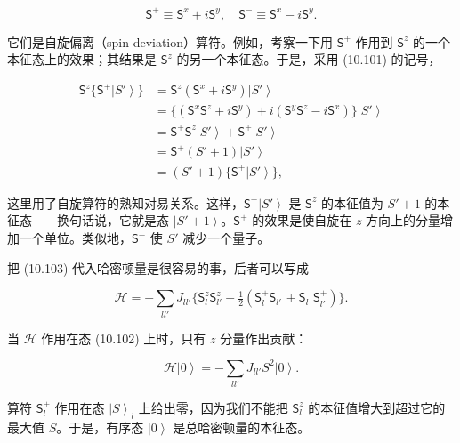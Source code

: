 \begin{equation*}
\mathsf{S}^{+} \equiv \mathsf{S}^{x} + i\mathsf{S}^{y}, \quad \mathsf{S}^{-} \equiv \mathsf{S}^{x} - i\mathsf{S}^{y}.
\tag{10.103}
\end{equation*}

它们是自旋偏离（spin-deviation）算符。例如，考察一下用 $\mathsf{S}^{+}$ 作用到 $\mathsf{S}^z$ 的一个本征态上的效果；其结果是 $\mathsf{S}^z$ 的另一个本征态。于是，采用 (10.101) 的记号，

\begin{align*}
\mathsf{S}^z\{\mathsf{S}^{+}\left|S'\right\rangle\} &= \mathsf{S}^z(\mathsf{S}^{x}+i\mathsf{S}^{y})\left|S'\right\rangle\\
&= \{(\mathsf{S}^{x}\mathsf{S}^z+i\mathsf{S}^{y})+i(\mathsf{S}^{y}\mathsf{S}^z-i\mathsf{S}^{x})\}\left|S'\right\rangle\\
&= \mathsf{S}^{+}\mathsf{S}^z\left|S'\right\rangle+\mathsf{S}^{+}\left|S'\right\rangle\\
&= \mathsf{S}^{+}(S'+1)\left|S'\right\rangle\\
&= (S'+1)\{\mathsf{S}^{+}\left|S'\right\rangle\},
\tag{10.104}
\end{align*}

这里用了自旋算符的熟知对易关系。这样，$\mathsf{S}^{+}\left|S'\right\rangle$ 是 $\mathsf{S}^z$ 的本征值为 $S'+1$ 的本征态——换句话说，它就是态 $\left|S'+1\right\rangle$。$\mathsf{S}^{+}$ 的效果是使自旋在 $z$ 方向上的分量增加一个单位。类似地，$\mathsf{S}^{-}$ 使 $S'$ 减少一个量子。


把 (10.103) 代入哈密顿量是很容易的事，后者可以写成

\begin{equation*}
\mathcal{H} = -\sum_{ll'} J_{ll'}\{\mathsf{S}_l^z\mathsf{S}_{l'}^z + \tfrac{1}{2}(\mathsf{S}_l^{+}\mathsf{S}_{l'}^{-}+\mathsf{S}_l^{-}\mathsf{S}_{l'}^{+})\}.
\tag{10.105}
\end{equation*}

当 $\mathcal{H}$ 作用在态 (10.102) 上时，只有 $z$ 分量作出贡献：

\begin{equation*}
\mathcal{H}\left|0\right\rangle = -\sum_{ll'} J_{ll'}S^2\left|0\right\rangle.
\tag{10.106}
\end{equation*}

算符 $\mathsf{S}_l^{+}$ 作用在态 $\left|S\right\rangle_l$ 上给出零，因为我们不能把 $\mathsf{S}_l^z$ 的本征值增大到超过它的最大值 $S$。于是，有序态 $\left|0\right\rangle$ 是总哈密顿量的本征态。

